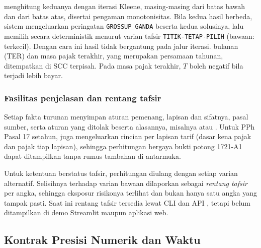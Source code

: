  menghitung keduanya dengan iterasi Kleene, masing-masing dari batas bawah dan dari batas atas, disertai pengaman monotonisitas. Bila kedua hasil berbeda, sistem mengeluarkan peringatan \texttt{GROSSUP\_GANDA} beserta kedua solusinya, lalu memilih secara deterministik menurut varian tafsir \texttt{TITIK-TETAP-PILIH} (bawaan: terkecil). Dengan cara ini hasil tidak bergantung pada jalur iterasi.  bulanan (TER) dan  masa pajak terakhir, yang merupakan persamaan tahunan, ditempatkan di SCC terpisah. Pada masa pajak terakhir, $T$ boleh negatif bila terjadi lebih bayar.

\subsubsection{Fasilitas penjelasan dan rentang tafsir}
Setiap fakta turunan menyimpan aturan pemenang, lapisan dan sifatnya, pasal sumber, serta aturan yang ditolak beserta alasannya, misalnya  atau . Untuk PPh Pasal 17 setahun,  juga mengeluarkan rincian per lapisan tarif (dasar kena pajak dan pajak tiap lapisan), sehingga perhitungan bergaya bukti potong 1721-A1 dapat ditampilkan tanpa rumus tambahan di antarmuka.

Untuk ketentuan berstatus tafsir, perhitungan diulang dengan setiap varian alternatif. Selisihnya terhadap varian bawaan dilaporkan sebagai \emph{rentang tafsir} per angka, sehingga eksposur risikonya terlihat dan bukan hanya satu angka yang tampak pasti. Saat ini rentang tafsir tersedia lewat CLI dan API , tetapi belum ditampilkan di demo Streamlit maupun aplikasi web.

\subsection{Kontrak Presisi Numerik dan Waktu}
\label{subsec:presisi}

